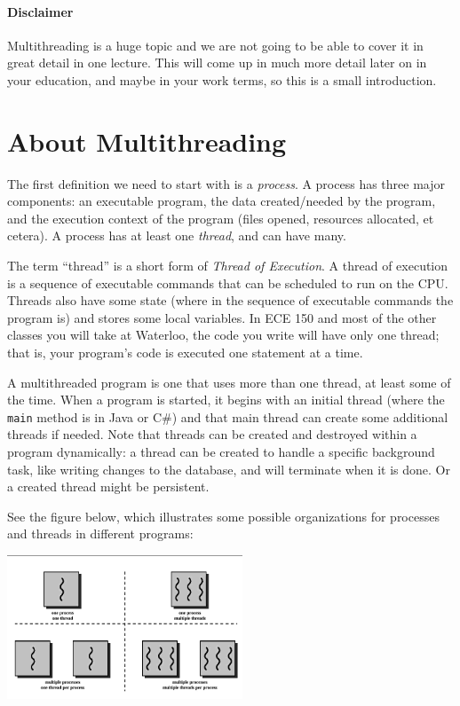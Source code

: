 




\paragraph{Disclaimer} Multithreading is a huge topic and we are not going to be able to cover it in great detail in one lecture. This will come up in much more detail later on in your education, and maybe in your work terms, so this is a small introduction.

\section*{About Multithreading}
The first definition we need to start with is a \textit{process}. A process has three major components: an executable program, the data created/needed by the program, and the execution context of the program (files opened, resources allocated, et cetera). A process has at least one \textit{thread}, and can have many.

The term ``thread'' is a short form of \textit{Thread of Execution}. A thread of execution is a sequence of executable commands that can be scheduled to run on the CPU. Threads also have some state (where in the sequence of executable commands the program is) and stores some local variables. In ECE 150 and most of the other classes you will take at Waterloo, the code you write will have only one thread; that is, your program's code is executed one statement at a time.

A multithreaded program is one that uses more than one thread, at least some of the time. When a program is started, it begins with an initial thread (where the \texttt{main} method is in Java or C\#) and that main thread can create some additional threads if needed. Note that threads can be created and destroyed within a program dynamically: a thread can be created to handle a specific background task, like writing changes to the database, and will terminate when it is done. Or a created thread might be persistent.

See the figure below, which illustrates some possible organizations for processes and threads in different programs:

\begin{center}
	\includegraphics[width=0.525\textwidth]{images/mthread.png} \cite{mthread}
\end{center}

